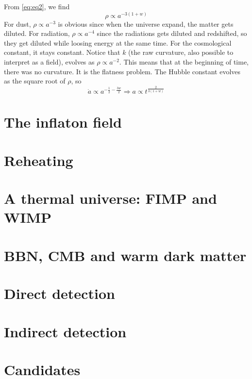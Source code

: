 \documentclass[a4paper]{book}
\theoremstyle{definition}
\theoremstyle{remark}
\begin{document}
From \eqref{eq:eq2}, we find 
\begin{equation}
    \rho \propto a^{-3(1 + w)}
\end{equation}
For dust, $\rho \propto a^{-3}$ is obvious since when the universe expand, the matter gets diluted. For radiation, $\rho \propto a^{-4}$ since the radiations gets diluted and redshifted, so they get diluted while loosing energy at the same time. For the cosmological constant, it stays constant. Notice that $k$ (the raw curvature, also possible to interpret as a field), evolves as $\rho \propto a^{-2}$. This means that at the beginning of time, there was no curvature. It is the flatness problem. The Hubble constant evolves as the square root of $\rho$, so 
\begin{equation}
    \dot a \propto a^{-\frac{1}{2} - \frac{3w}{2}} \Rightarrow a \propto t^{\frac{2}{3(1 + w)}}
\end{equation}
\chapter{The inflaton field}

\chapter{Reheating}

\chapter{A thermal universe: FIMP and WIMP}

\chapter{BBN, CMB and warm dark matter}

\chapter{Direct detection}

\chapter{Indirect detection}

\chapter{Candidates}
\end{document}
